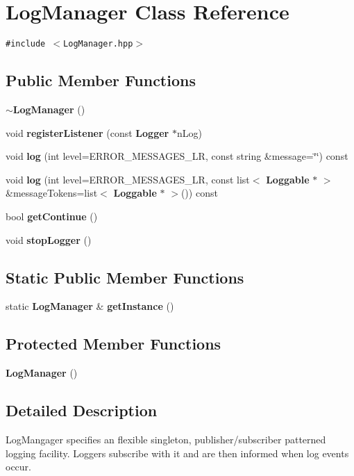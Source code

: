 \section{Log\-Manager Class Reference}
\label{classLogManager}
{\tt \#include $<$Log\-Manager.hpp$>$}

\subsection*{Public Member Functions}
\begin{CompactItemize}
\item 
{\bf $\sim$Log\-Manager} ()
\item 
void {\bf register\-Listener} (const {\bf Logger} $\ast$n\-Log)
\item 
void {\bf log} (int level=ERROR\_\-MESSAGES\_\-LR, const string \&message=\char`\"{}\char`\"{}) const 
\item 
void {\bf log} (int level=ERROR\_\-MESSAGES\_\-LR, const list$<$ {\bf Loggable} $\ast$ $>$ \&message\-Tokens=list$<$ {\bf Loggable} $\ast$ $>$()) const 
\item 
bool {\bf get\-Continue} ()\label{classLogManager_a4}

\item 
void {\bf stop\-Logger} ()\label{classLogManager_a5}

\end{CompactItemize}
\subsection*{Static Public Member Functions}
\begin{CompactItemize}
\item 
static {\bf Log\-Manager} \& {\bf get\-Instance} ()\label{classLogManager_e0}

\end{CompactItemize}
\subsection*{Protected Member Functions}
\begin{CompactItemize}
\item 
{\bf Log\-Manager} ()
\end{CompactItemize}


\subsection{Detailed Description}
Log\-Mangager specifies an flexible singleton, publisher/subscriber patterned logging facility. Loggers subscribe with it and are then informed when log events occur.



